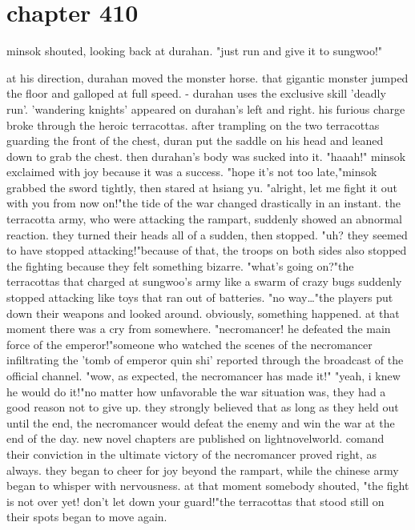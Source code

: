 \section{chapter 410}

minsok shouted, looking back at durahan.
 "just run and give it to sungwoo!"




at his direction, durahan moved the monster horse.
 that gigantic monster jumped the floor and galloped at full speed.
- durahan uses the exclusive skill 'deadly run'.
'wandering knights' appeared on durahan's left and right.
 his furious charge broke through the heroic terracottas.
after trampling on the two terracottas guarding the front of the chest, duran put the saddle on his head and leaned down to grab the chest.
 then durahan's body was sucked into it.
"haaah!" minsok exclaimed with joy because it was a success.
"hope it's not too late,"minsok grabbed the sword tightly, then stared at hsiang yu.
"alright, let me fight it out with you from now on!"the tide of the war changed drastically in an instant.
the terracotta army, who were attacking the rampart, suddenly showed an abnormal reaction.
 they turned their heads all of a sudden, then stopped.
"uh? they seemed to have stopped attacking!"because of that, the troops on both sides also stopped the fighting because they felt something bizarre.
"what's going on?"the terracottas that charged at sungwoo's army like a swarm of crazy bugs suddenly stopped attacking like toys that ran out of batteries.
"no way…"the players put down their weapons and looked around.
 obviously, something happened.
at that moment there was a cry from somewhere.
"necromancer! he defeated the main force of the emperor!"someone who watched the scenes of the necromancer infiltrating the 'tomb of emperor quin shi' reported through the broadcast of the official channel.
"wow, as expected, the necromancer has made it!"
"yeah, i knew he would do it!"no matter how unfavorable the war situation was, they had a good reason not to give up.
they strongly believed that as long as they held out until the end, the necromancer would defeat the enemy and win the war at the end of the day.
new novel chapters are published on lightnovelworld.
c­omand their conviction in the ultimate victory of the necromancer proved right, as always.
they began to cheer for joy beyond the rampart, while the chinese army began to whisper with nervousness.
at that moment somebody shouted, "the fight is not over yet! don't let down your guard!"the terracottas that stood still on their spots began to move again.
